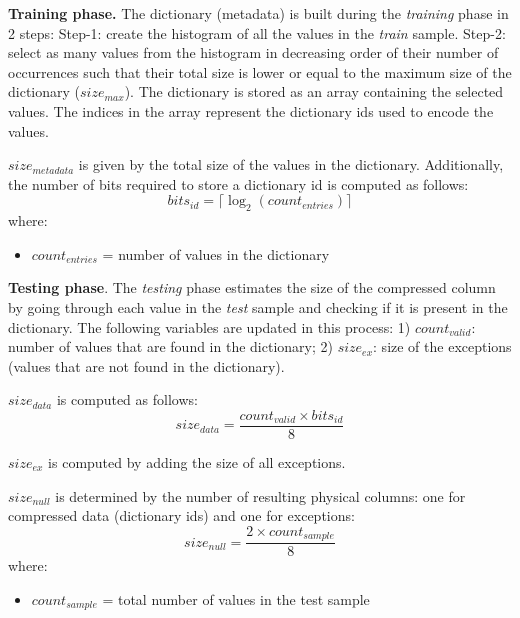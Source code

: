 \textbf{Training phase.} The dictionary (metadata) is built during the \textit{training} phase in 2 steps: Step-1: create the histogram of all the values in the \textit{train} sample. Step-2: select as many values from the histogram in decreasing order of their number of occurrences such that their total size is lower or equal to the maximum size of the dictionary (\(size_{max}\)). The dictionary is stored as an array containing the selected values. The indices in the array represent the dictionary ids used to encode the values.

\(size_{metadata}\) is given by the total size of the values in the dictionary. Additionally, the number of bits required to store a dictionary id is computed as follows:
\begin{equation}
\label{eq:estimators:dict:bitsid}
bits_{id} = \lceil \log_2 (count_{entries}) \rceil
\end{equation}
where:
\begin{itemize}
    \item[] \(count_{entries}\) = number of values in the dictionary
\end{itemize}

\textbf{Testing phase}. The \textit{testing} phase estimates the size of the compressed column by going through each value in the \textit{test} sample and checking if it is present in the dictionary. The following variables are updated in this process: 1) \(count_{valid}\): number of values that are found in the dictionary; 2) \(size_{ex}\): size of the exceptions (values that are not found in the dictionary).

\(size_{data}\) is computed as follows:
\begin{equation}
\label{eq:estimators:dict:sizedata}
size_{data} = \frac{count_{valid} \times bits_{id}}{8}
\end{equation}

\(size_{ex}\) is computed by adding the size of all exceptions.

\(size_{null}\) is determined by the number of resulting physical columns: one for compressed data (dictionary ids) and one for exceptions:
\begin{equation}
\label{eq:estimators:dict:sizenull}
size_{null} = \frac{2 \times count_{sample}}{8}
\end{equation}
where:
\begin{itemize}
    \item[] \(count_{sample}\) = total number of values in the test sample
\end{itemize}


